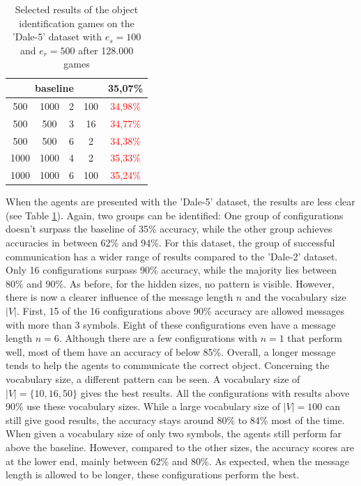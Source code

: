 \begin{table}[ht]
\begin{tabular}{cccc|c}
        \multicolumn{4}{c|}{baseline} & {35,07\%}                                                     \\\midrule
        {500}                         & {1000}    & {2} & {100} & \textcolor{red}{34,98\%}            \\
        {500}                         & {500}     & {3} & {16}  & \textcolor{red}{34,77\%}            \\
        {500}                         & {500}     & {6} & {2}   & \textcolor{red}{34,38\%}            \\
        {1000}                        & {1000}    & {4} & {2}   & \textcolor{red}{35,33\%}            \\
        {1000}                        & {1000}    & {6} & {100} & \textcolor{red}{35,24\%}            \\
        \bottomrule
    \end{tabular}
    \caption{Selected results of the object identification games on the 'Dale-5' dataset with $e_s=100$ and $e_r=500$ after 128.000 games}
    \label{tab:results_discriminator_dale-5}
\end{table}

When the agents are presented with the 'Dale-5' dataset, the results are less clear (see Table \ref{tab:results_discriminator_dale-5}).
Again, two groups can be identified: One group of configurations doesn't surpass the baseline of 35\% accuracy, while the other group achieves accuracies in between 62\% and 94\%.
For this dataset, the group of successful communication has a wider range of results compared to the 'Dale-2' dataset.
Only 16 configurations surpass 90\% accuracy, while the majority lies between 80\% and 90\%.
As before, for the hidden sizes, no pattern is visible.
However, there is now a clearer influence of the message length $n$ and the vocabulary size $|V|$.
First, 15 of the 16 configurations above 90\% accuracy are allowed messages with more than 3 symbols.
Eight of these configurations even have a message length $n = 6$.
Although there are a few configurations with $n = 1$ that perform well, most of them have an accuracy of below 85\%.
Overall, a longer message tends to help the agents to communicate the correct object.
Concerning the vocabulary size, a different pattern can be seen.
A vocabulary size of $|V| = \{10,16,50\}$ gives the best results.
All the configurations with results above 90\% use these vocabulary sizes.
While a large vocabulary size of $|V| = 100$ can still give good results, the accuracy stays around 80\% to 84\% most of the time.
When given a vocabulary size of only two symbols, the agents still perform far above the baseline.
However, compared to the other sizes, the accuracy scores are at the lower end, mainly between 62\% and 80\%.
As expected, when the message length is allowed to be longer, these configurations perform the best.

